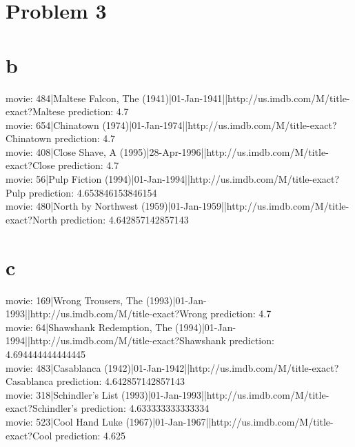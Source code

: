 \documentclass[12pt]{article}
\begin{document}
\section*{Problem 3}
\section*{b}
movie: 484|Maltese Falcon, The (1941)|01-Jan-1941||http://us.imdb.com/M/title-exact?Maltese%
 prediction: 4.7 \\
movie: 654|Chinatown (1974)|01-Jan-1974||http://us.imdb.com/M/title-exact?Chinatown%
 prediction: 4.7 \\
movie: 408|Close Shave, A (1995)|28-Apr-1996||http://us.imdb.com/M/title-exact?Close%
 prediction: 4.7 \\
movie: 56|Pulp Fiction (1994)|01-Jan-1994||http://us.imdb.com/M/title-exact?Pulp%
 prediction: 4.653846153846154 \\
movie: 480|North by Northwest (1959)|01-Jan-1959||http://us.imdb.com/M/title-exact?North%
 prediction: 4.642857142857143 \\
 \section*{c} 
 movie: 169|Wrong Trousers, The (1993)|01-Jan-1993||http://us.imdb.com/M/title-exact?Wrong%
 prediction: 4.7 \\
movie: 64|Shawshank Redemption, The (1994)|01-Jan-1994||http://us.imdb.com/M/title-exact?Shawshank%
 prediction: 4.694444444444445 \\
movie: 483|Casablanca (1942)|01-Jan-1942||http://us.imdb.com/M/title-exact?Casablanca%
 prediction: 4.642857142857143 \\
movie: 318|Schindler's List (1993)|01-Jan-1993||http://us.imdb.com/M/title-exact?Schindler's%
 prediction: 4.633333333333334 \\
movie: 523|Cool Hand Luke (1967)|01-Jan-1967||http://us.imdb.com/M/title-exact?Cool%
 prediction: 4.625 \\
\end{document}

